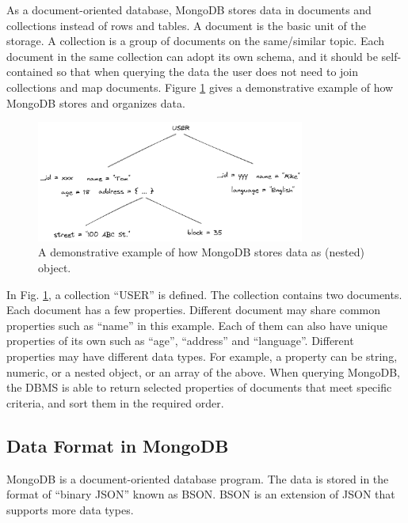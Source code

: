 As a document-oriented database, MongoDB stores data in documents and collections instead of rows and tables. A document is the basic unit of the storage. A collection is a group of documents on the same/similar topic. Each document in the same collection can adopt its own schema, and it should be self-contained so that when querying the data the user does not need to join collections and map documents. Figure \ref{ch:database:mongotree} gives a demonstrative example of how MongoDB stores and organizes data.
\begin{figure}[htbp]
	\centering
	\includegraphics[width=250pt]{chapters/part-3/figures/mongodb_tree.png}
	\caption{A demonstrative example of how MongoDB stores data as (nested) object.} \label{ch:database:mongotree}
\end{figure}

In Fig. \ref{ch:database:mongotree}, a collection ``USER'' is defined. The collection contains two documents. Each document has a few properties. Different document may share common properties such as ``name'' in this example. Each of them can also have unique properties of its own such as ``age'', ``address'' and ``language''. Different properties may have different data types. For example, a property can be string, numeric, or a nested object, or an array of the above. When querying MongoDB, the DBMS is able to return selected properties of documents that meet specific criteria, and sort them in the required order.

\subsection{Data Format in MongoDB}

MongoDB is a document-oriented database program. The data is stored in the format of ``binary JSON'' known as BSON. BSON is an extension of JSON that supports more data types.

